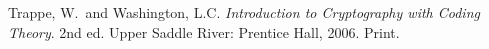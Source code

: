 \begin{thebibliography}{1}




 Trappe, W.\ and Washington, L.C. \textit{Introduction to Cryptography with Coding Theory}. 2nd ed. Upper Saddle River: Prentice Hall, 2006. Print.




\end{thebibliography}
